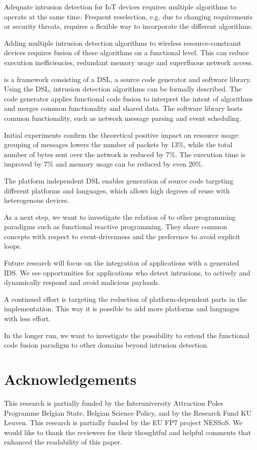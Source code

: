 \documentclass[conference]{IEEEtran}
\begin{document}
Adequate intrusion detection for IoT devices requires multiple algorithms to
operate at the same time. Frequent reselection, e.g. due to changing
requirements or security threats, requires a flexible way to incorporate the
different algorithms.

Adding multiple intrusion detection algorithms to wireless resource-constraint
devices requires fusion of these algorithms on a functional level. This can
reduce execution inefficiencies, redundant memory usage and superfluous network
access.

\NAME is a framework consisting of a DSL, a source code generator and software
library. Using the DSL, intrusion detection algorithms can be formally
described. The code generator applies functional code fusion to interpret the
intent of algorithms and merges common functionality and shared data. The
software library hosts common functionality, such as network message parsing
and event scheduling.

Initial experiments confirm the theoretical positive impact on resource usage:
grouping of messages lowers the number of packets by 13\%, while the total
number of bytes sent over the network is reduced by 7\%. The execution time is
improved by 7\% and memory usage can be reduced by even 20\%.

The platform independent DSL enables generation of source code targeting
different platforms and languages, which allows high degrees of reuse with
heterogenous devices.

As a next step, we want to investigate the relation of \NAME to other
programming paradigms such as functional reactive programming. They share
common concepts with respect to event-drivenness and the preference to avoid
explicit loops.

Future research will focus on the integration of applications with a generated
IDS. We see opportunities for applications who detect intrusions, to actively
and dynamically respond and avoid malicious payloads.

A continued effort is targeting the reduction of platform-dependent parts in
the implementation. This way it is possible to add more platforms and languages
with less effort.

In the longer run, we want to investigate the possibility to extend the
functional code fusion paradigm to other domains beyond intrusion detection.

\section{Acknowledgements}

This research is partially funded by the Interuniversity Attraction Poles
Programme Belgian State, Belgian Science Policy, and by the Research Fund KU
Leuven. This research is partially funded by the EU FP7 project NESSoS\@. We
would like to thank the reviewers for their thoughtful and helpful comments
that enhanced the readability of this paper.



\end{document}
